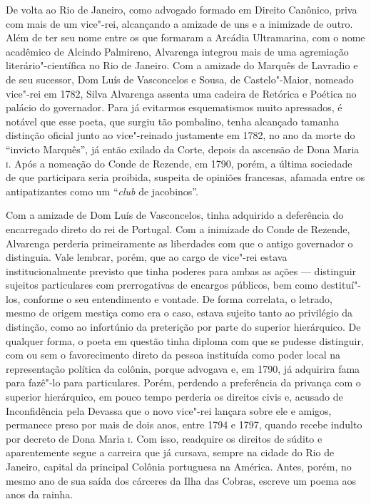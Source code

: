 De volta ao Rio de Janeiro, como advogado formado em Direito Canônico, priva com
mais de um vice"-rei, alcançando a amizade de uns e a inimizade de outro. %
Além de ter seu nome entre os que formaram a Arcádia Ultramarina, com o nome
acadêmico de Alcindo Palmireno, Alvarenga integrou mais de uma agremiação
literário"-científica no Rio de Janeiro.  Com a amizade do Marquês de Lavradio e
de seu sucessor, Dom Luís de Vasconcelos e Sousa, de Castelo"-Maior, nomeado
vice"-rei em 1782, Silva Alvarenga assenta uma cadeira de Retórica e Poética no
palácio do governador.  Para já evitarmos esquematismos muito apressados, é
notável que esse poeta, que surgiu tão pombalino, tenha alcançado tamanha
distinção oficial junto ao vice"-reinado justamente em 1782, no ano da morte do
``invicto Marquês'', já então exilado da Corte, depois da ascensão de Dona
Maria \textsc{i}.  Após a nomeação do Conde de Rezende, em 1790, porém, a última
sociedade de que participara seria proibida, suspeita de opiniões francesas,
afamada entre os antipatizantes como um ``\textit{club} de jacobinos''.


Com a amizade de Dom Luís de Vasconcelos, tinha adquirido a deferência do
encarregado direto do rei de Portugal. Com a inimizade do Conde de Rezende,
Alvarenga perderia primeiramente as liberdades com que o antigo governador o
distinguia.  Vale lembrar, porém, que ao cargo de vice"-rei estava
institucionalmente previsto que tinha poderes para ambas as ações --- distinguir
sujeitos particulares com prerrogativas de encargos públicos, bem como
destituí"-los, conforme o seu entendimento e vontade.  De forma correlata, o
letrado, mesmo de origem mestiça como era o caso, estava sujeito tanto ao
privilégio da distinção, como ao infortúnio da preterição por parte do superior
hierárquico. De qualquer forma, o poeta em questão tinha diploma com que se
pudesse distinguir, com ou sem o favorecimento direto da pessoa instituída como
poder local na representação política da colônia, porque advogava e, em 1790, já
adquirira fama para fazê"-lo para particulares.  Porém, perdendo a preferência da privança com o superior hierárquico, em pouco tempo perderia os direitos civis e, acusado de Inconfidência pela Devassa que o novo vice"-rei lançara sobre ele e amigos, permanece preso por mais de dois anos, entre 1794 e 1797, quando recebe indulto por decreto de Dona Maria \textsc{i}. Com isso, readquire os direitos de súdito e aparentemente segue a carreira que já cursava, sempre na cidade do Rio de Janeiro, capital da principal Colônia portuguesa na América. Antes, porém, no mesmo ano de sua saída dos cárceres da Ilha das Cobras, escreve um poema aos anos da rainha.  


